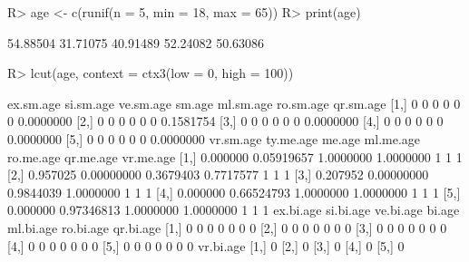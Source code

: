 \begin{Schunk}
% --begin: "lcut.numeric"
\begin{Sinput}
R> age <- c(runif(n = 5, min = 18, max = 65))
R> print(age)
\end{Sinput}
\begin{Soutput}
[1] 54.88504 31.71075 40.91489 52.24082 50.63086
\end{Soutput}
\begin{Sinput}
R> lcut(age, context = ctx3(low = 0, high = 100))
\end{Sinput}
\begin{Soutput}
     ex.sm.age si.sm.age ve.sm.age sm.age ml.sm.age ro.sm.age qr.sm.age
[1,]         0         0         0      0         0         0 0.0000000
[2,]         0         0         0      0         0         0 0.1581754
[3,]         0         0         0      0         0         0 0.0000000
[4,]         0         0         0      0         0         0 0.0000000
[5,]         0         0         0      0         0         0 0.0000000
     vr.sm.age  ty.me.age    me.age ml.me.age ro.me.age qr.me.age vr.me.age
[1,]  0.000000 0.05919657 1.0000000 1.0000000         1         1         1
[2,]  0.957025 0.00000000 0.3679403 0.7717577         1         1         1
[3,]  0.207952 0.00000000 0.9844039 1.0000000         1         1         1
[4,]  0.000000 0.66524793 1.0000000 1.0000000         1         1         1
[5,]  0.000000 0.97346813 1.0000000 1.0000000         1         1         1
     ex.bi.age si.bi.age ve.bi.age bi.age ml.bi.age ro.bi.age qr.bi.age
[1,]         0         0         0      0         0         0         0
[2,]         0         0         0      0         0         0         0
[3,]         0         0         0      0         0         0         0
[4,]         0         0         0      0         0         0         0
[5,]         0         0         0      0         0         0         0
     vr.bi.age
[1,]         0
[2,]         0
[3,]         0
[4,]         0
[5,]         0
\end{Soutput}
%
% --end: "lcut.numeric"
\end{Schunk}
